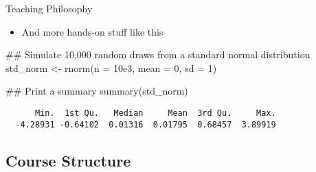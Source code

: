 \documentclass[12pt,ignorenonframetext,aspectratio=169]{beamer}
\providecommand{\tightlist}{%
	\setlength{\itemsep}{0.25em}\setlength{\parskip}{0pt}}
\newenvironment{Shaded}{\linespread{1}}{}
\newcommand{\AttributeTok}[1]{#1}
\newcommand{\DecValTok}[1]{#1}
\newcommand{\DocumentationTok}[1]{\textcolor[rgb]{0.00,0.50,0.00}{#1}}
\newcommand{\FloatTok}[1]{#1}
\newcommand{\FunctionTok}[1]{#1}
\newcommand{\NormalTok}[1]{#1}
\newcommand{\OtherTok}[1]{\textcolor[rgb]{1.00,0.25,0.00}{#1}}
\begin{document}
\begin{frame}[fragile]{Teaching Philosophy}
\protect\hypertarget{teaching-philosophy-1}{}
\begin{itemize}[<+->]
\tightlist
\item
  And more hands-on stuff like this
\end{itemize}

\begin{Shaded}
\begin{Highlighting}[]
\DocumentationTok{\#\# Simulate 10,000 random draws from a standard normal distribution}
\NormalTok{std\_norm }\OtherTok{\textless{}{-}} \FunctionTok{rnorm}\NormalTok{(}\AttributeTok{n =} \FloatTok{10e3}\NormalTok{, }\AttributeTok{mean =} \DecValTok{0}\NormalTok{, }\AttributeTok{sd =} \DecValTok{1}\NormalTok{)}

\DocumentationTok{\#\# Print a summary}
\FunctionTok{summary}\NormalTok{(std\_norm)}
\end{Highlighting}
\end{Shaded}

\begin{verbatim}
      Min.  1st Qu.   Median     Mean  3rd Qu.     Max. 
  -4.28931 -0.64102  0.01316  0.01795  0.68457  3.89919
\end{verbatim}
\end{frame}

\hypertarget{course-structure}{%
\subsection{Course Structure}\label{course-structure}}
\end{document}
